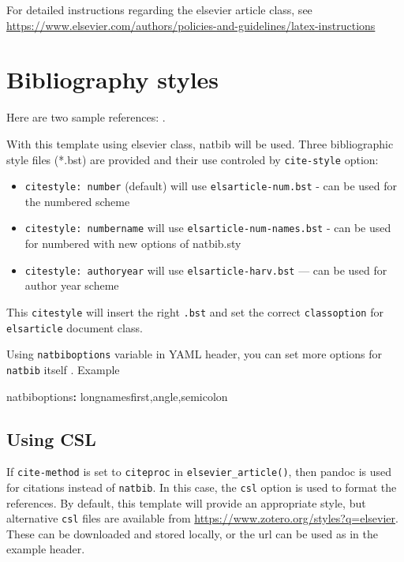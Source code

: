 \documentclass[
  authoryear,
  preprint]{elsarticle}
\newenvironment{Shaded}{\begin{snugshade}}{\end{snugshade}}
\newcommand{\AttributeTok}[1]{\textcolor[rgb]{0.40,0.45,0.13}{#1}}
\newcommand{\FunctionTok}[1]{\textcolor[rgb]{0.28,0.35,0.67}{#1}}
\newcommand{\KeywordTok}[1]{\textcolor[rgb]{0.00,0.23,0.31}{\textbf{#1}}}
\providecommand{\tightlist}{%
  \setlength{\itemsep}{0pt}\setlength{\parskip}{0pt}}
\begin{document}
For detailed instructions regarding the elsevier article class, see
\url{https://www.elsevier.com/authors/policies-and-guidelines/latex-instructions}

\section{Bibliography styles}\label{bibliography-styles}

Here are two sample references: \citet{Feynman1963118}
\citet{Dirac1953888}.

With this template using elsevier class, natbib will be used. Three
bibliographic style ﬁles (*.bst) are provided and their use controled by
\texttt{cite-style} option:

\begin{itemize}
\tightlist
\item
  \texttt{citestyle:\ number} (default) will use
  \texttt{elsarticle-num.bst} - can be used for the numbered scheme
\item
  \texttt{citestyle:\ numbername} will use
  \texttt{elsarticle-num-names.bst} - can be used for numbered with new
  options of natbib.sty
\item
  \texttt{citestyle:\ authoryear} will use \texttt{elsarticle-harv.bst}
  --- can be used for author year scheme
\end{itemize}

This \texttt{citestyle} will insert the right \texttt{.bst} and set the
correct \texttt{classoption} for \texttt{elsarticle} document class.

Using \texttt{natbiboptions} variable in YAML header, you can set more
options for \texttt{natbib} itself . Example

\begin{Shaded}
\begin{Highlighting}[]
\FunctionTok{natbiboptions}\KeywordTok{:}\AttributeTok{ longnamesfirst,angle,semicolon}
\end{Highlighting}
\end{Shaded}

\subsection{Using CSL}\label{using-csl}

If \texttt{cite-method} is set to \texttt{citeproc} in
\texttt{elsevier\_article()}, then pandoc is used for citations instead
of \texttt{natbib}. In this case, the \texttt{csl} option is used to
format the references. By default, this template will provide an
appropriate style, but alternative \texttt{csl} files are available from
\url{https://www.zotero.org/styles?q=elsevier}. These can be downloaded
and stored locally, or the url can be used as in the example header.
\end{document}
